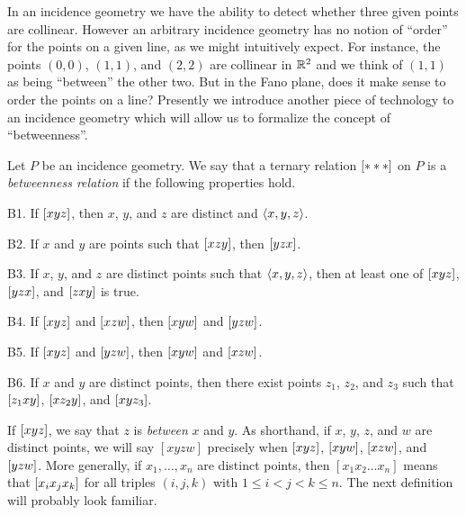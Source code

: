 In an incidence geometry we have the ability to detect whether three given points are collinear.
However an arbitrary incidence geometry has no notion of ``order'' for the points on a given line, as we might intuitively expect.
For instance, the points \((0,0)\), \((1,1)\), and \((2,2)\) are collinear in \(\mathbb{R}^2\) and we think of \((1,1)\) as being ``between'' the other two.
But in the Fano plane, does it make sense to order the points on a line?
Presently we introduce another piece of technology to an incidence geometry which will allow us to formalize the concept of ``betweenness''.

\begin{dfn}[Betweenness]
Let \(P\) be an incidence geometry.
We say that a ternary relation \([ \ast \ast \ast ]\) on \(P\) is a \emph{betweenness relation} if the following properties hold.
\begin{proplist}
\item[B1.] If \([ x y z ]\), then \(x\), \(y\), and \(z\) are distinct and \(\langle x, y, z \rangle\).
\item[B2.] If \(x\) and \(y\) are points such that \([ x z y ]\), then \([ y z x ]\).
\item[B3.] If \(x\), \(y\), and \(z\) are distinct points such that \(\langle x, y, z \rangle\), then at least one of \([ x y z ]\), \([ y z x ]\), and \([ z x y ]\) is true.
\item[B4.] If \([ x y z ]\) and \([ x z w ]\), then \([ x y w ]\) and \([ y z w ]\).
\item[B5.] If \([ x y z ]\) and \([ y z w ]\), then \([ x y w ]\) and \([ x z w ]\).
\item[B6.] If \(x\) and \(y\) are distinct points, then there exist points \(z_1\), \(z_2\), and \(z_3\) such that \([ z_1 x y ]\), \([ x z_2 y ]\), and \([ x y z_3 ]\).
\end{proplist}
\end{dfn}

If \([ x y z ]\), we say that \(z\) is \emph{between} \(x\) and \(y\).
As shorthand, if \(x\), \(y\), \(z\), and \(w\) are distinct points, we will say \([xyzw]\) precisely when \([ x y z ]\), \([ x y w ]\), \([ x z w ]\), and \([ y z w ]\).
More generally, if \(x_1, \ldots, x_n\) are distinct points, then \([x_1x_2 \ldots x_n]\) means that \([ x_i x_j x_k ]\) for all triples \((i,j,k)\) with \(1 \leq i < j < k \leq n\).
The next definition will probably look familiar.

